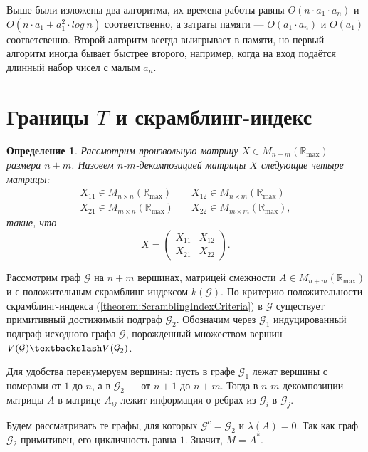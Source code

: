 \documentclass[12pt]{article}
\newtheorem{definition}[theorem]{Определение}
\begin{document}
Выше были изложены два алгоритма, их времена работы равны $O(n \cdot a_1 \cdot a_n)$ и \\
$O(n \cdot a_1 + a_1^2 \cdot log \ n)$ соответственно, а затраты памяти --- $O(a_1 \cdot a_n)$ и $O(a_1)$ соответсвенно. Второй алгоритм всегда выигрывает в памяти, но первый алгоритм иногда бывает быстрее второго, например, когда на вход подаётся длинный набор чисел с малым $a_n$.

\section{Границы $T$ и скрамблинг-индекс}
\begin{definition}
Рассмотрим произвольную матрицу $X \in M_{n+m}(\mathbb{R}_{\max})$ размера $n + m$. Назовем $n$-$m$-декомпозицией матрицы $X$ следующие четыре матрицы:\begin{align*}
X_{11} \in M_{n \times n}(\mathbb{R}_{\max}) & \quad X_{12} \in M_{n \times m}(\mathbb{R}_{\max}) \\
X_{21} \in M_{m \times n}(\mathbb{R}_{\max}) & \quad X_{22} \in M_{m \times m}(\mathbb{R}_{\max}),
\end{align*}
такие, что \begin{equation*}
X = \begin{pmatrix}
X_{11} & X_{12} \\
X_{21} & X_{22}
\end{pmatrix}.
\end{equation*}
\end{definition}

Рассмотрим граф $\mathcal{G}$ на $n + m$ вершинах, матрицей смежности $A \in M_{n+m}(\mathbb{R}_{\max})$ и с положительным скрамблинг-индексом $k(\mathcal{G})$. По критерию положительности скрамблинг-индекса (\ref{theorem:ScramblingIndexCriteria}) в $\mathcal{G}$ существует примитивный достижимый подграф $\mathcal{G}_2$.  Обозначим через $\mathcal{G}_1$ индуцированный подграф исходного графа $\mathcal{G}$, порожденный множеством вершин $V(\mathcal{G}) \textbackslash V(\mathcal{G}_2)$.

Для удобства перенумеруем вершины: пусть в графе $\mathcal{G}_1$ лежат вершины с номерами от $1$ до $n$, а в $\mathcal{G}_2$ --- от $n + 1$ до $n + m$. Тогда в $n$-$m$-декомпозиции матрицы $A$ в матрице $A_{ij}$ лежит информация о ребрах из $\mathcal{G}_i$ в $\mathcal{G}_j$.

Будем рассматривать те графы, для которых $\mathcal{G}^c = \mathcal{G}_2$ и $\lambda(A) = 0$. Так как граф $\mathcal{G}_2$ примитивен, его цикличность равна $1$. Значит, $M = A^*$.
\end{document}
